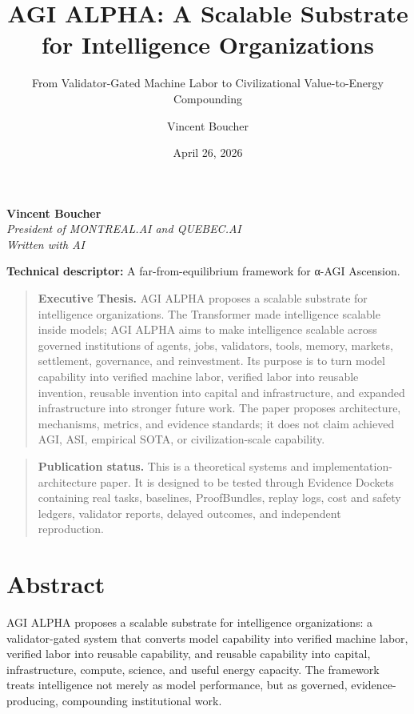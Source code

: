 \documentclass[
  11pt,
]{article}
\title{AGI ALPHA: A Scalable Substrate for Intelligence Organizations}
\subtitle{From Validator-Gated Machine Labor to Civilizational
Value-to-Energy Compounding}
\author{Vincent Boucher}
\date{April 26, 2026}
\begin{document}
\maketitle

\textbf{Vincent Boucher}\\
\emph{President of MONTREAL.AI and QUEBEC.AI}\\
\emph{Written with AI}

\textbf{Technical descriptor:} A far-from-equilibrium framework for
α-AGI Ascension.

\begin{quote}
\textbf{Executive Thesis.} AGI ALPHA proposes a scalable substrate for
intelligence organizations. The Transformer made intelligence scalable
inside models; AGI ALPHA aims to make intelligence scalable across
governed institutions of agents, jobs, validators, tools, memory,
markets, settlement, governance, and reinvestment. Its purpose is to
turn model capability into verified machine labor, verified labor into
reusable invention, reusable invention into capital and infrastructure,
and expanded infrastructure into stronger future work. The paper
proposes architecture, mechanisms, metrics, and evidence standards; it
does not claim achieved AGI, ASI, empirical SOTA, or civilization-scale
capability.
\end{quote}

\begin{quote}
\textbf{Publication status.} This is a theoretical systems and
implementation-architecture paper. It is designed to be tested through
Evidence Dockets containing real tasks, baselines, ProofBundles, replay
logs, cost and safety ledgers, validator reports, delayed outcomes, and
independent reproduction.
\end{quote}

\newpage

\section{Abstract}\label{abstract}

AGI ALPHA proposes a scalable substrate for intelligence organizations:
a validator-gated system that converts model capability into verified
machine labor, verified labor into reusable capability, and reusable
capability into capital, infrastructure, compute, science, and useful
energy capacity. The framework treats intelligence not merely as model
performance, but as governed, evidence-producing, compounding
institutional work.
\end{document}
